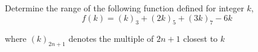 Determine the range of the following function defined for  integer $k$, \[f(k)=(k)_3+(2k)_5+(3k)_7-6k\]

where $(k)_{2n+1}$ denotes the multiple of $2n+1$ closest to $k$
